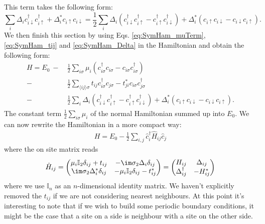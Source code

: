 \documentclass[../main.tex]{subfile}
\begin{document}
This term takes the following form:
\begin{equation}\label{eq:SymHam_Delta}
\sum_{i} \Delta_i c_{i\downarrow}^{\dagger}c_{i\uparrow}^{\dagger} + \Delta_i^{\ast} c_{i\uparrow}c_{i\downarrow}
        = \frac{1}{2}\sum_{i} \Delta_i \left(c_{i\downarrow}^{\dagger}c_{i\uparrow}^{\dagger}-c_{i\uparrow}^{\dagger}c_{i\downarrow}^{\dagger}\right)+ \Delta_i^{\ast} \left(c_{i\uparrow}c_{i\downarrow}-c_{i\downarrow}c_{i\uparrow}\right).
\end{equation}
We then finish this section by using Eqs. \ref{eq:SymHam_muTerm}, \ref{eq:SymHam_tij} and \ref{eq:SymHam_Delta} in the Hamiltonian and obtain the following form:
\begin{equation}\label{eq:Ham_Symm_Supercond_1}
    \begin{aligned}
    H = E_0 ~-~& \frac{1}{2} \sum_{i\sigma} \mu_i\left(c_{i\sigma}^{\dagger}c_{i\sigma} - c_{i\sigma}c_{i\sigma}^{\dagger}\right)\\
    -& \frac{1}{2}\sum_{\langle ij\rangle \sigma} t_{ij}c_{i\sigma}^{\dagger}c_{j\sigma} - t_{ji}^{\ast}c_{i\sigma}c_{j\sigma}^{\dagger}\\
    -& \frac{1}{2}\sum_{i} \Delta_i \left(c_{i\downarrow}^{\dagger}c_{i\uparrow}^{\dagger}-c_{i\uparrow}^{\dagger}c_{i\downarrow}^{\dagger}\right) +
    \Delta_i^{\ast} \left(c_{i\uparrow}c_{i\downarrow}-c_{i\downarrow}c_{i\uparrow}\right).
    \end{aligned}
\end{equation}
The constant term $\frac{1}{2} \sum_{i\sigma} \mu_i$ of the normal Hamiltonian summed up into $E_0$.
We can now rewrite the Hamiltonian in a more compact way:
\begin{align}
    H = E_0 - \frac{1}{2}\sum_{i,j} \hat{c}_i^{\dagger} \hat{H}_{ij} \hat{c}_j  \label{eq:BdG_sys_H}
\end{align}
where the on site matrix reads
\begin{align}
    \hat{H}_{ij} = \begin{pmatrix}
        \mu_i \mathbb{I}_2 \delta_{ij} + t_{ij} & -\im\sigma_2\Delta_i \delta_{ij}\\
        \im\sigma_2\Delta^{\ast}_i \delta_{ij} & -\mu_i \mathbb{I}_2 \delta_{ij} - t_{ij}^{\ast}
    \end{pmatrix} = \begin{pmatrix}
        H_{ij} & \Delta_{ij}\\
        \Delta_{ij}^{\dagger} & -H_{ij}^{\ast}
    \end{pmatrix}    \label{eq:H^_ij} 
\end{align}
where we use $\mathbb{I}_n$ as an $n$-dimensional identity matrix. We haven't explicitly removed the 
$t_{ij}$ if we are not considering nearest neighbours.
At this point it's interesting to note that if we wish to build some periodic boundary conditions, 
it might be the case that a site on a side is neighbour with a site on the other side.\\  
\end{document}
